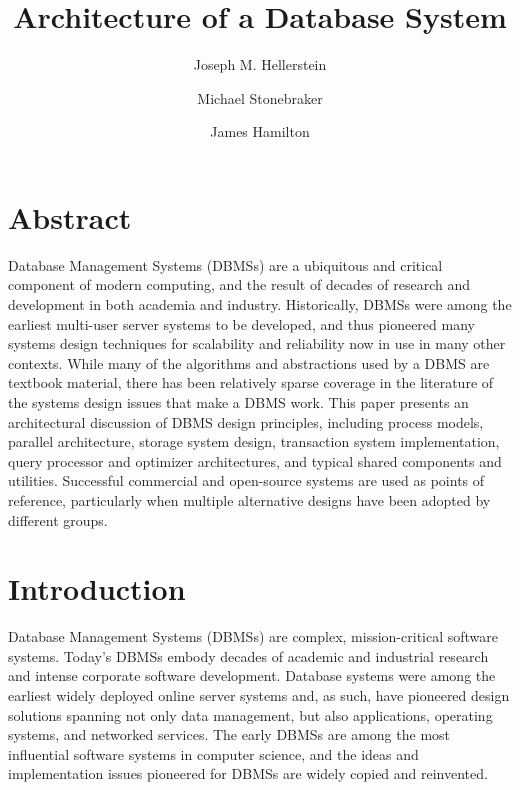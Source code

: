\documentclass[b5paper,11pt,twoside,openright]{book}
\title{Architecture of a Database System}
\author{Joseph M. Hellerstein}
\affil{University of California, Berkeley, USA, hellerstein@cs.berkeley.edu}
\author{Michael Stonebraker}
\affil{Massachusetts Institute of Technology, USA}
\author{James Hamilton}
\affil{Microsoft Research, USA}
\date{}
\begin{document}
\maketitle
\thispagestyle{empty}

\cleardoublepage{}
\tableofcontents{}

\hypertarget{abstract}{%
\chapter*{Abstract}\label{abstract}}

Database Management Systems (DBMSs) are a ubiquitous and critical
component of modern computing, and the result of decades of research and
development in both academia and industry. Historically, DBMSs were
among the earliest multi-user server systems to be developed, and thus
pioneered many systems design techniques for scalability and reliability
now in use in many other contexts. While many of the algorithms and
abstractions used by a DBMS are textbook material, there has been
relatively sparse coverage in the literature of the systems design
issues that make a DBMS work. This paper presents an architectural
discussion of DBMS design principles, including process models, parallel
architecture, storage system design, transaction system implementation,
query processor and optimizer architectures, and typical shared
components and utilities. Successful commercial and open-source systems
are used as points of reference, particularly when multiple alternative
designs have been adopted by different groups.

\hypertarget{introduction}{%
\chapter{Introduction}\label{introduction}}

Database Management Systems (DBMSs) are complex, mission-critical
software systems. Today's DBMSs embody decades of academic and
industrial research and intense corporate software development. Database
systems were among the earliest widely deployed online server systems
and, as such, have pioneered design solutions spanning not only data
management, but also applications, operating systems, and networked
services. The early DBMSs are among the most influential software
systems in computer science, and the ideas and implementation issues
pioneered for DBMSs are widely copied and reinvented.
\end{document}
